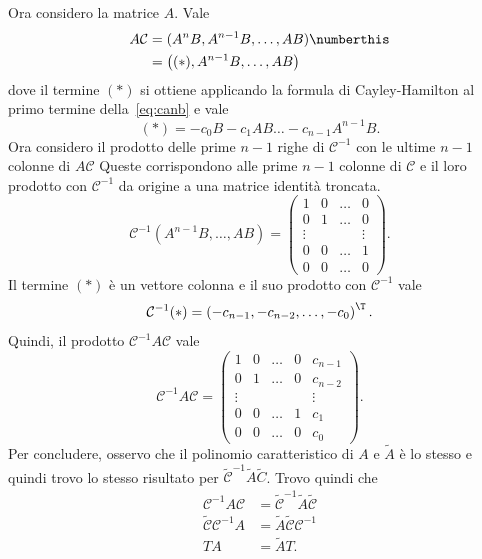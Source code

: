 \begin{steps}
    Ora considero la matrice $A$.
    Vale
    \begin{align*}
        A\mathcal C &= (A^n B, A^{n-1} B, \ldots, AB) \numberthis\label{eq:canb} \\
        &= \left((*), A^{n-1} B, \ldots, AB \right)
    \end{align*}
    dove il termine $(*)$ si ottiene applicando la formula di Cayley-Hamilton
    al primo termine della~\eqref{eq:canb} e vale
    \begin{equation*}
     (*) = -c_0 B - c_{1} AB \ldots - c_{n-1}A^{n-1} B.
    \end{equation*}
    Ora considero il prodotto delle prime $n-1$ righe di  $\mathcal C^{-1}$
    con le ultime $n-1$ colonne di $A\mathcal C$
    Queste corrispondono alle prime $n-1$ colonne di $\mathcal C$ e il loro prodotto
    con $\mathcal C^{-1}$ da origine a una matrice identità troncata.
    \begin{equation*}
        \mathcal C^{-1} (A^{n-1} B, \ldots, AB) = \left(
        \begin{array}{cccc}
            1 & 0 & \ldots & 0  \\
            0 & 1 & \ldots & 0 \\
            \vdots & & &   \vdots\\
            0 & 0 & \ldots & 1 \\
            0 & 0 & \ldots & 0
        \end{array}
        \right).
    \end{equation*}
    Il termine $(*)$ è un vettore colonna e il suo prodotto con $\mathcal C^{-1}$ vale
    \begin{equation*}
        \mathcal C^{-1}(*) = \left(
             -c_{n-1},
            -c_{n-2},
            \ldots,     -c_0
        \right)^\T.
    \end{equation*}
    Quindi, il prodotto $\mathcal C^{-1}A\mathcal C$ vale
    \begin{equation*}
        \mathcal C^{-1} A \mathcal C = \left(
        \begin{array}{ccccc}
            1 & 0 & \ldots & 0 & c_{n-1} \\
            0 & 1 & \ldots & 0 & c_{n-2}\\
            \vdots & & & &  \vdots\\
            0 & 0 & \ldots & 1 & c_{1}\\
            0 & 0 & \ldots & 0 & c_0
        \end{array}
        \right).
    \end{equation*}
    Per concludere, osservo che il polinomio caratteristico di $A$ e $\tilde A$ è
    lo stesso e quindi trovo lo stesso risultato per $\tilde {\mathcal C}^{-1} \tilde A \tilde C$.
    Trovo quindi che
    \begin{align*}
        \mathcal C^{-1} A\mathcal C &= \tilde {\mathcal C}^{-1} \tilde A \tilde {\mathcal C} \\
        \tilde {\mathcal C}  {\mathcal C}^{-1}A &= \tilde A \tilde {\mathcal C} {\mathcal C}^{-1} \\
        T A &= \tilde A T.
    \end{align*}



\end{steps}

